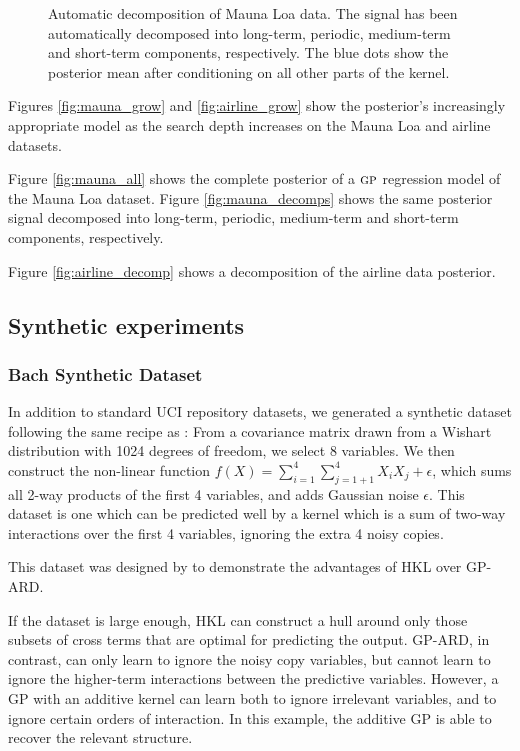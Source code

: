 \documentclass[twoside]{article}
\begin{document}
\begin{figure}[h!]
\begin{minipage}{\columnwidth}
\begin{tabular}{cc}
\end{tabular}
\caption{Automatic decomposition of Mauna Loa data.  The signal has been automatically decomposed into long-term, periodic, medium-term and short-term components, respectively.  The blue dots show the posterior mean after conditioning on all other parts of the kernel. }
\end{minipage}
\end{figure}
\label{fig:mauna_decomps}



Figures \ref{fig:mauna_grow} and \ref{fig:airline_grow} show the posterior's increasingly appropriate model as the search depth increases on the Mauna Loa and airline datasets.

Figure \ref{fig:mauna_all} shows the complete posterior of a ${\textsc{gp}}$ regression model of the Mauna Loa dataset.  Figure \ref{fig:mauna_decomps} shows the same posterior signal decomposed into long-term, periodic, medium-term and short-term components, respectively.

Figure \ref{fig:airline_decomp} shows a decomposition of the airline data posterior.

\subsection{Synthetic experiments}

\subsubsection{Bach Synthetic Dataset}
In addition to standard UCI repository datasets, we generated a synthetic dataset following the same recipe as \cite{DBLP:journals/corr/abs-0909-0844}: From a covariance matrix drawn from a Wishart distribution with 1024 degrees of freedom, we select 8 variables.  We then construct the non-linear function $f(X) = \sum_{i=1}^4 \sum_{j=1+1}^4 X_i X_j + \epsilon$, which sums all 2-way products of the first 4 variables, and adds Gaussian noise $\epsilon$.  This dataset is one which can be predicted well by a kernel which is a sum of two-way interactions over the first 4 variables, ignoring the extra 4 noisy copies.

This dataset was designed by \cite{DBLP:journals/corr/abs-0909-0844} to demonstrate the advantages of HKL over GP-ARD. 

If the dataset is large enough, HKL can construct a hull around only those subsets of cross terms that are optimal for predicting the output.  GP-ARD, in contrast, can only learn to ignore the noisy copy variables, but cannot learn to ignore the higher-term interactions between the predictive variables.  However, a GP with an additive kernel can learn both to ignore irrelevant variables, and to ignore certain orders of interaction.  In this example, the additive GP is able to recover the relevant structure.
\end{document}
